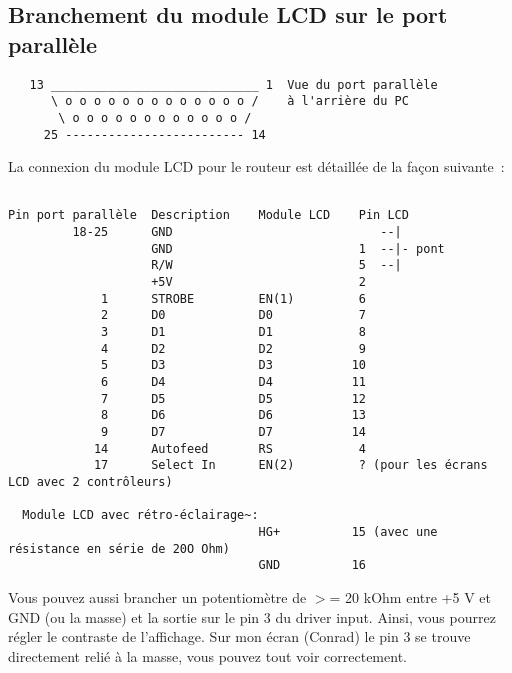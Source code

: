 \subsection{Branchement du module LCD sur le port parallèle}
 
\begin{example}
\begin{verbatim}
   13 _____________________________ 1  Vue du port parallèle
      \ o o o o o o o o o o o o o /    à l'arrière du PC
       \ o o o o o o o o o o o o /
     25 ------------------------- 14
\end{verbatim}
\end{example}
   

 La connexion du module LCD pour le routeur est détaillée de la façon suivante~:

 
\begin{example}
\begin{verbatim}
 
Pin port parallèle  Description    Module LCD    Pin LCD
         18-25      GND                             --|
                    GND                          1  --|- pont
                    R/W                          5  --|
                    +5V                          2
             1      STROBE         EN(1)         6
             2      D0             D0            7
             3      D1             D1            8
             4      D2             D2            9
             5      D3             D3           10
             6      D4             D4           11
             7      D5             D5           12
             8      D6             D6           13
             9      D7             D7           14
            14      Autofeed       RS            4
            17      Select In      EN(2)         ? (pour les écrans LCD avec 2 contrôleurs)

  Module LCD avec rétro-éclairage~:
                                   HG+          15 (avec une résistance en série de 20O Ohm)
                                   GND          16
\end{verbatim}
\end{example}

    Vous pouvez aussi brancher un potentiomètre de $>$= 20 kOhm entre +5 V et GND
	(ou la masse) et la sortie sur le pin 3 du driver input. Ainsi, vous pourrez
	régler le contraste de l'affichage. Sur mon écran (Conrad) le pin 3 se trouve
	directement relié à la masse, vous pouvez tout voir correctement.

